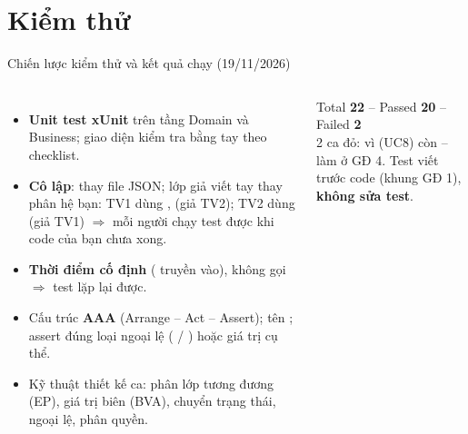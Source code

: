\section{Kiểm thử}

\newcommand{\pass}{\textcolor{okc}{\textbf{PASS}}}
\newcommand{\fail}{\textcolor{warn}{\textbf{FAIL}}}

\begin{frame}{Chiến lược kiểm thử và kết quả chạy (19/11/2026)}
\begin{columns}[T]
\scriptsize
\begin{itemize}
  \item \textbf{Unit test xUnit} trên tầng Domain và Business; giao diện kiểm tra bằng tay theo checklist.
  \item \textbf{Cô lập}:  thay file JSON; lớp giả viết tay thay phân hệ bạn: TV1 dùng ,  (giả TV2); TV2 dùng  (giả TV1) $\Rightarrow$ mỗi người chạy test được khi code của bạn chưa xong.
  \item \textbf{Thời điểm cố định} ( truyền vào), không gọi  $\Rightarrow$ test lặp lại được.
  \item Cấu trúc \textbf{AAA} (Arrange -- Act -- Assert); tên ; assert đúng loại ngoại lệ ( / ) hoặc giá trị cụ thể.
  \item Kỹ thuật thiết kế ca: phân lớp tương đương (EP), giá trị biên (BVA), chuyển trạng thái, ngoại lệ, phân quyền.
\end{itemize}
\centering
{}

\vspace{1mm}
\begin{block}{}
\scriptsize
Total \textbf{22} -- Passed \textbf{20} -- Failed \textbf{2}\\
2 ca đỏ:  vì  (UC8) còn  -- làm ở GĐ 4. Test viết trước code (khung GĐ 1), \textbf{không sửa test}.
\end{block}
\end{columns}
\end{frame}

